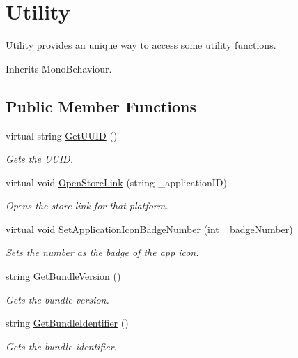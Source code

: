 \hypertarget{class_voxel_busters_1_1_native_plugins_1_1_utility}{}\section{Utility}
\label{class_voxel_busters_1_1_native_plugins_1_1_utility}


\hyperlink{class_voxel_busters_1_1_native_plugins_1_1_utility}{Utility} provides an unique way to access some utility functions.  




Inherits Mono\+Behaviour.

\subsection*{Public Member Functions}
\begin{DoxyCompactItemize}
\item 
virtual string \hyperlink{class_voxel_busters_1_1_native_plugins_1_1_utility_aa0a494ec8043e7b97271b5606e61e9d1}{Get\+U\+U\+I\+D} ()
\begin{DoxyCompactList}\small\item\em Gets the U\+U\+I\+D. \end{DoxyCompactList}\item 
virtual void \hyperlink{class_voxel_busters_1_1_native_plugins_1_1_utility_aec7bab11eef8dd5fe5ba1e6c3bc0ec88}{Open\+Store\+Link} (string \+\_\+application\+I\+D)
\begin{DoxyCompactList}\small\item\em Opens the store link for that platform. \end{DoxyCompactList}\item 
virtual void \hyperlink{class_voxel_busters_1_1_native_plugins_1_1_utility_a38e9d705af1cf352fa2032f46caf7389}{Set\+Application\+Icon\+Badge\+Number} (int \+\_\+badge\+Number)
\begin{DoxyCompactList}\small\item\em Sets the number as the badge of the app icon. \end{DoxyCompactList}\item 
string \hyperlink{class_voxel_busters_1_1_native_plugins_1_1_utility_a49ed7cf25cd6825fe480cf65396705ab}{Get\+Bundle\+Version} ()
\begin{DoxyCompactList}\small\item\em Gets the bundle version. \end{DoxyCompactList}\item 
string \hyperlink{class_voxel_busters_1_1_native_plugins_1_1_utility_aaac01c4c543f2426dc423e227336e94f}{Get\+Bundle\+Identifier} ()
\begin{DoxyCompactList}\small\item\em Gets the bundle identifier. \end{DoxyCompactList}\end{DoxyCompactItemize}


